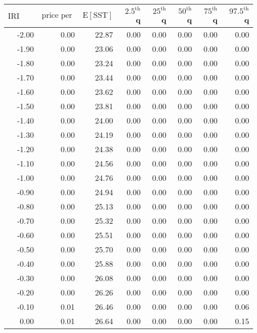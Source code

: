 \begin{table*}[ht]
\centering \footnotesize
\begin{tabular}{rrrrrrrr}
  \hline
$\mbox{IRI anom}$ & $\mbox{price per USD}$ & $\mbox{E}[\mbox{SST}]$ & $2.5^{\mbox{th}}$ q & $25^{\mbox{th}}$ q & $50^{\mbox{th}}$ q & $75^{\mbox{th}}$ q & $97.5^{\mbox{th}}$ q \\ 
  \hline
-2.00 & 0.00 & 22.87 & 0.00 & 0.00 & 0.00 & 0.00 & 0.00 \\ 
  -1.90 & 0.00 & 23.06 & 0.00 & 0.00 & 0.00 & 0.00 & 0.00 \\ 
  -1.80 & 0.00 & 23.24 & 0.00 & 0.00 & 0.00 & 0.00 & 0.00 \\ 
  -1.70 & 0.00 & 23.44 & 0.00 & 0.00 & 0.00 & 0.00 & 0.00 \\ 
  -1.60 & 0.00 & 23.62 & 0.00 & 0.00 & 0.00 & 0.00 & 0.00 \\ 
  -1.50 & 0.00 & 23.81 & 0.00 & 0.00 & 0.00 & 0.00 & 0.00 \\ 
  -1.40 & 0.00 & 24.00 & 0.00 & 0.00 & 0.00 & 0.00 & 0.00 \\ 
  -1.30 & 0.00 & 24.19 & 0.00 & 0.00 & 0.00 & 0.00 & 0.00 \\ 
  -1.20 & 0.00 & 24.38 & 0.00 & 0.00 & 0.00 & 0.00 & 0.00 \\ 
  -1.10 & 0.00 & 24.56 & 0.00 & 0.00 & 0.00 & 0.00 & 0.00 \\ 
  -1.00 & 0.00 & 24.76 & 0.00 & 0.00 & 0.00 & 0.00 & 0.00 \\ 
  -0.90 & 0.00 & 24.94 & 0.00 & 0.00 & 0.00 & 0.00 & 0.00 \\ 
  -0.80 & 0.00 & 25.13 & 0.00 & 0.00 & 0.00 & 0.00 & 0.00 \\ 
  -0.70 & 0.00 & 25.32 & 0.00 & 0.00 & 0.00 & 0.00 & 0.00 \\ 
  -0.60 & 0.00 & 25.51 & 0.00 & 0.00 & 0.00 & 0.00 & 0.00 \\ 
  -0.50 & 0.00 & 25.70 & 0.00 & 0.00 & 0.00 & 0.00 & 0.00 \\ 
  -0.40 & 0.00 & 25.88 & 0.00 & 0.00 & 0.00 & 0.00 & 0.00 \\ 
  -0.30 & 0.00 & 26.08 & 0.00 & 0.00 & 0.00 & 0.00 & 0.00 \\ 
  -0.20 & 0.00 & 26.26 & 0.00 & 0.00 & 0.00 & 0.00 & 0.00 \\ 
  -0.10 & 0.01 & 26.46 & 0.00 & 0.00 & 0.00 & 0.00 & 0.06 \\ 
  0.00 & 0.01 & 26.64 & 0.00 & 0.00 & 0.00 & 0.00 & 0.15 \\ 

\end{tabular}
\end{table*}
